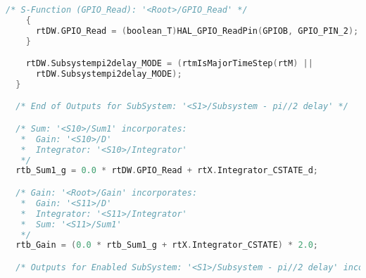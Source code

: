 \begin{lstlisting}[language=C,caption=Model.c]
    /* S-Function (GPIO_Read): '<Root>/GPIO_Read' */
    {
      rtDW.GPIO_Read = (boolean_T)HAL_GPIO_ReadPin(GPIOB, GPIO_PIN_2);
    }

    rtDW.Subsystempi2delay_MODE = (rtmIsMajorTimeStep(rtM) ||
      rtDW.Subsystempi2delay_MODE);
  }

  /* End of Outputs for SubSystem: '<S1>/Subsystem - pi//2 delay' */

  /* Sum: '<S10>/Sum1' incorporates:
   *  Gain: '<S10>/D'
   *  Integrator: '<S10>/Integrator'
   */
  rtb_Sum1_g = 0.0 * rtDW.GPIO_Read + rtX.Integrator_CSTATE_d;

  /* Gain: '<Root>/Gain' incorporates:
   *  Gain: '<S11>/D'
   *  Integrator: '<S11>/Integrator'
   *  Sum: '<S11>/Sum1'
   */
  rtb_Gain = (0.0 * rtb_Sum1_g + rtX.Integrator_CSTATE) * 2.0;

  /* Outputs for Enabled SubSystem: '<S1>/Subsystem - pi//2 delay' incorporates:


\end{lstlisting}

